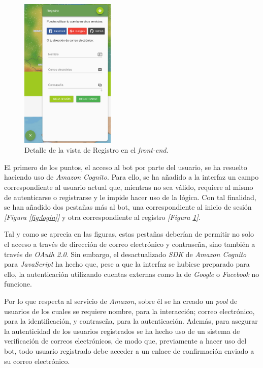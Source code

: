 \documentclass[11pt,spanish,listoffigures]{tfgetsinf}
\begin{document}
\begin{figure}[h!]
    \centering
    \includegraphics[width=0.4\textwidth]{images/img14.png}
    \caption{ Detalle de la vista de Registro en el \textit{front-end}.}
    \label{fig:signup}
\end{figure}

El primero de los puntos, el acceso al bot por parte del usuario, se ha resuelto haciendo uso de \textit{Amazon Cognito}. Para ello, se ha añadido a la interfaz un campo correspondiente al usuario actual que, mientras no sea válido, requiere al mismo de autenticarse o registrarse y le impide hacer uso de la lógica. Con tal finalidad, se han añadido dos pestañas más al bot, una correspondiente al inicio de sesión \textit{[Figura \ref{fig:login}]} y otra correspondiente al registro \textit{[Figura \ref{fig:signup}]}.

Tal y como se aprecia en las figuras, estas pestañas deberían de permitir no solo el acceso a través de dirección de correo electrónico y contraseña, sino también a través de \textit{OAuth 2.0}. Sin embargo, el desactualizado \textit{SDK} de \textit{Amazon Cognito} para \textit{JavaScript} ha hecho que, pese a que la interfaz se hubiese preparado para ello, la autenticación utilizando cuentas externas como la de \textit{Google} o \textit{Facebook} no funcione. 

Por lo que respecta al servicio de \textit{Amazon}, sobre él se ha creado un \textit{pool} de usuarios de los cuales se requiere nombre, para la interacción; correo electrónico, para la identificación, y contraseña, para la autenticación. Además, para asegurar la autenticidad de los usuarios registrados se ha hecho uso de un sistema de verificación de correos electrónicos, de modo que, previamente a hacer uso del bot, todo usuario registrado debe acceder a un enlace de confirmación enviado a su correo electrónico.
\end{document}
